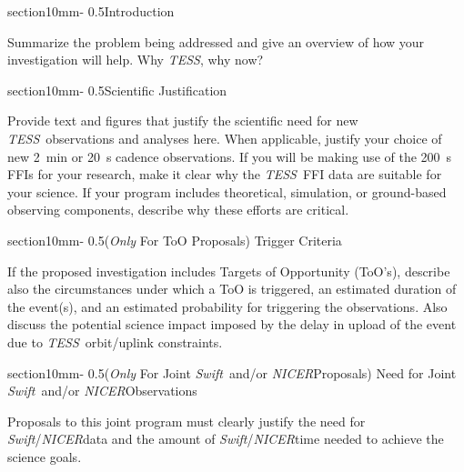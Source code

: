 \documentclass[letterpaper,12pt]{article}
\makeatletter
\renewcommand{\section}{\@startsection%
{section}{1}{0mm}{-\baselineskip}%
{0.5\baselineskip}{\normalfont\Large\bfseries}}%
\newcommand{\tess}{{\it TESS}}
\newcommand{\swift}{{\it Swift}}
\newcommand{\nicer}{{\it NICER}}
\makeatother
\begin{document}
\section{Introduction}

Summarize the problem being addressed and give an overview of how your investigation will help. 
Why \tess, why now?

\section{Scientific Justification}

Provide text and figures that justify the scientific need for new \tess\ observations and analyses here. When applicable, justify your choice of new 2~min or 20~s cadence observations. 
If you will be making use of the 200~s FFIs for your research, make it clear why the \tess\ FFI data are suitable for your science.
If your program includes theoretical, simulation, or ground-based observing components, describe why these efforts are critical.


\section{({\it Only} For ToO Proposals) Trigger Criteria}

If the proposed investigation includes Targets of Opportunity (ToO's), describe also the circumstances 
under which a ToO is triggered, an estimated duration of the event(s), and an estimated probability for 
triggering the observations. Also discuss the potential science impact imposed by the delay in upload 
of the event due to \tess\ orbit/uplink constraints.


\section{({\it Only} For Joint \swift\ and/or  \nicer Proposals) Need for Joint \swift\ and/or \nicer Observations}

Proposals to this joint program must clearly justify the need for \swift/\nicer data and the amount of \swift/\nicer time needed to achieve the science goals.\\
\end{document}
